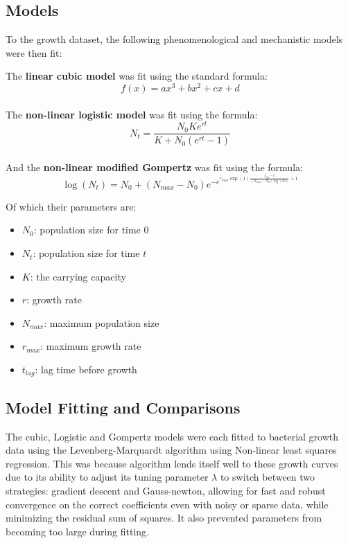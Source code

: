 \documentclass[11pt]{article}
\begin{document}
\subsection{Models}

To the growth dataset, the following phenomenological and mechanistic models were then fit:
    \setlength{\parskip}{1.2em} %

    \noindent The \textbf{linear cubic model} was fit using the standard formula:\\
    \[f(x) = ax^3 + bx^2 + cx + d\]\\
    The \textbf{non-linear logistic model} was fit using the formula\cite{verhulst1838notice,tsoularis2002analysis}:\\
    \[N_t = \frac{N_0 K e^{r t}}{K + N_0 (e^{r t} - 1)}\]\\
    And the \textbf{non-linear modified Gompertz} was fit using the formula\cite{zwietering1990modeling}:\\
    \[\log(N_t) = N_0 + (N_{max} - N_0) e^{-e^{r_{max} \exp(1) \frac{t_{lag} - t}{(N_{max} - N_0) \log(10)} + 1}}\]

Of which their parameters are:

\begin{itemize}
  \item $N_0$: population size for time $0$
  \item $N_t$: population size for time $t$
  \item $K$: the carrying capacity
  \item $r$: growth rate
  \item $N_{max}$: maximum population size
  \item $r_{max}$: maximum growth rate
  \item $t_{lag}$: lag time before growth
\end{itemize}

    \subsection{Model Fitting and Comparisons}
The cubic, Logistic and Gompertz models were each fitted to bacterial growth data using the Levenberg-Marquardt algorithm using Non-linear least squares regression. This was because algorithm lends itself well to these growth curves due to its ability to adjust its tuning parameter $\lambda$ to switch between two strategies: gradient descent and Gauss-newton, allowing for fast and robust convergence on the correct coefficients even with noisy or sparse data, while minimizing the residual sum of squares. It also prevented parameters from becoming too large during fitting\cite{transtrum2012improvements}.   
\setlength{\parskip}{1.2em} %
\end{document}
